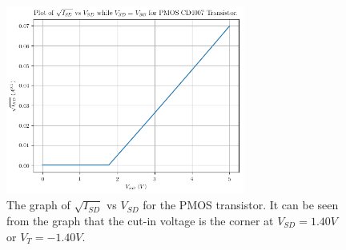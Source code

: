 \documentclass[titlepage, 12pt]{article}
\begin{document}
    \begin{figure}[H]
        \centering
        \includegraphics[width = 0.7\textwidth]{figures/part_1_psqrt.png}
        \caption{The graph of $\sqrt{I_{SD}}$ vs $V_{SD}$ for the PMOS
        transistor. It can be seen from the graph that the cut-in
        voltage is the corner at $V_{SD} = 1.40V$ or $V_T = -1.40V$.}
        \label{fig:part_1d_p}
    \end{figure}
\end{document}
